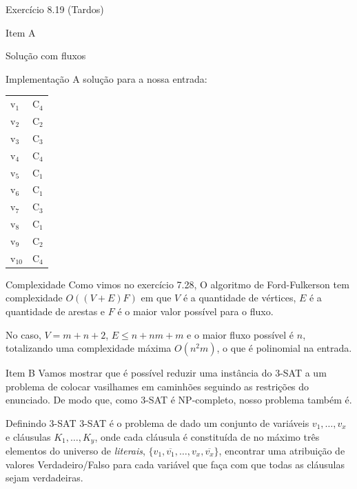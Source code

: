 \documentclass[presentation]{beamer}
\begin{document}
\begin{frame}[fragile,label=sec-6]{Exercício 8.19 (Tardos)}
\begin{block}{Item A}
\begin{block}{Solução com fluxos}
\begin{block}{Implementação}
A solução para a nossa entrada:
\begin{center}
\begin{tabular}{ll}
v$_{\text{1}}$ & C$_{\text{4}}$\\
v$_{\text{2}}$ & C$_{\text{2}}$\\
v$_{\text{3}}$ & C$_{\text{3}}$\\
v$_{\text{4}}$ & C$_{\text{4}}$\\
v$_{\text{5}}$ & C$_{\text{1}}$\\
v$_{\text{6}}$ & C$_{\text{1}}$\\
v$_{\text{7}}$ & C$_{\text{3}}$\\
v$_{\text{8}}$ & C$_{\text{1}}$\\
v$_{\text{9}}$ & C$_{\text{2}}$\\
v$_{\text{10}}$ & C$_{\text{4}}$\\
\end{tabular}
\end{center}
\end{block}

\begin{block}{Complexidade}
Como vimos no exercício 7.28, O algoritmo de Ford-Fulkerson tem
complexidade $O((V + E)F)$ em que $V$ é a quantidade de vértices, $E$
é a quantidade de arestas e $F$ é o maior valor possível para o fluxo.

No caso, $V = m + n + 2$, $E \leq n + nm + m$ e o maior fluxo possível é
$n$, totalizando uma complexidade máxima $O(n^2m)$, o que é polinomial na
entrada.
\end{block}
\end{block}
\end{block}

\begin{block}{Item B}
Vamos mostrar que é possível reduzir uma instância do 3-SAT a um
problema de colocar vasilhames em caminhões seguindo as restrições do
enunciado. De modo que, como 3-SAT é NP-completo, nosso problema
também é.

\begin{block}{Definindo 3-SAT}
3-SAT é o problema de dado um conjunto de variáveis $v_1, \ldots, v_x$
e cláusulas $K_1, \ldots, K_y$, onde cada cláusula é constituída de no
máximo três elementos do universo de \textit{literais}, $\{v_1,
\overline{v_1}, \ldots, v_x, \overline{v_x}\}$, encontrar uma
atribuição de valores Verdadeiro/Falso para cada variável
que faça com que todas as cláusulas sejam verdadeiras.
\end{block}


\end{block}
\end{frame}
\end{document}
